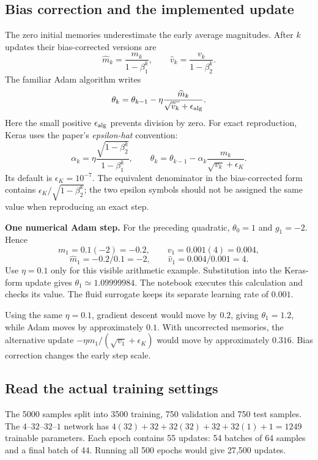 \clearpage
\subsection{Bias correction and the implemented update}
The zero initial memories underestimate the early average magnitudes. After
$k$ updates their bias-corrected versions are
\[
\widehat m_k=\frac{m_k}{1-\beta_1^k},\qquad
\widehat v_k=\frac{v_k}{1-\beta_2^k}.
\]
The familiar Adam algorithm writes
\[
\theta_k=\theta_{k-1}-\eta\frac{\widehat m_k}
{\sqrt{\widehat v_k}+\epsilon_{\rm alg}}.
\]
Here the small positive $\epsilon_{\rm alg}$ prevents division by zero.
For exact reproduction, Keras uses the paper's \emph{epsilon-hat} convention:
\[
\alpha_k=\eta\frac{\sqrt{1-\beta_2^k}}{1-\beta_1^k},\qquad
\boxed{\theta_k=\theta_{k-1}-\alpha_k
\frac{m_k}{\sqrt{v_k}+\epsilon_K}.}
\]
Its default is $\epsilon_K=10^{-7}$. The equivalent denominator in the
bias-corrected form contains $\epsilon_K/\sqrt{1-\beta_2^k}$; the two epsilon
symbols should not be assigned the same value when reproducing an exact step.

\textbf{One numerical Adam step.} For the preceding quadratic, $\theta_0=1$
and $g_1=-2$. Hence
\[
m_1=0.1(-2)=-0.2,\qquad v_1=0.001(4)=0.004,
\]
\[
\widehat m_1=-0.2/0.1=-2,\qquad
\widehat v_1=0.004/0.001=4.
\]
Use $\eta=0.1$ only for this visible arithmetic example. Substitution into the
Keras-form update gives $\theta_1\simeq1.09999984$. The notebook executes
this calculation and checks its value. The fluid surrogate keeps its separate
learning rate of $0.001$.

Using the same $\eta=0.1$, gradient descent would move by $0.2$, giving
$\theta_1=1.2$, while Adam moves by approximately $0.1$. With uncorrected
memories, the alternative update $-\eta m_1/(\sqrt{v_1}+\epsilon_K)$ would
move by approximately $0.316$. Bias correction changes the early step scale.

\clearpage
\subsection{Read the actual training settings}
The 5000 samples split into 3500 training, 750 validation and 750 test samples.
The $4$--$32$--$32$--$1$ network has
$4(32)+32+32(32)+32+32(1)+1=1249$ trainable parameters.
Each epoch contains 55 updates: 54 batches of 64 samples and a final batch of 44.
Running all 500 epochs would give 27,500 updates.

